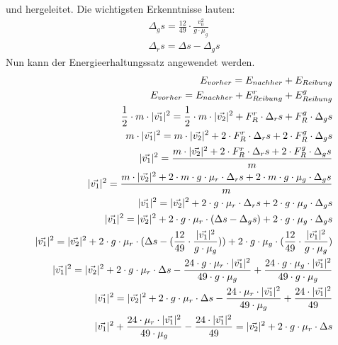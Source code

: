und hergeleitet. Die wichtigsten Erkenntnisse lauten:
\begin{align}
    \Delta_g s = \frac{12}{49} \cdot \frac{v_0^2}{g \cdot \mu_g}\\
    \Delta_r s = \Delta s - \Delta_g s
\end{align}
Nun kann der Energieerhaltungssatz angewendet werden.
\begin{align}
    E_{vorher} = E_{nachher} + E_{Reibung}\\
    E_{vorher} = E_{nachher} + E^r_{Reibung} + E^g_{Reibung}\\
    \frac{1}{2} \cdot m \cdot \norm{\vec{v_1}}^2 = \frac{1}{2} \cdot m \cdot \norm{\vec{v_2}}^2 + F^r_R \cdot \Delta_r s + F^g_R \cdot \Delta_g s\\
    m \cdot \norm{\vec{v_1}}^2 = m \cdot \norm{\vec{v_2}}^2 + 2 \cdot F^r_R \cdot \Delta_r s + 2 \cdot F^g_R \cdot \Delta_g s\\
    \norm{\vec{v_1}}^2 = \frac{m \cdot \norm{\vec{v_2}}^2 + 2 \cdot F^r_R \cdot \Delta_r s + 2 \cdot F^g_R \cdot \Delta_g s}{m}\\
    \norm{\vec{v_1}}^2 = \frac{m \cdot \norm{\vec{v_2}}^2 + 2 \cdot m \cdot g \cdot \mu_r \cdot \Delta_r s + 2 \cdot m \cdot g \cdot \mu_g \cdot \Delta_g s}{m}\\
    \norm{\vec{v_1}}^2 = \norm{\vec{v_2}}^2 + 2 \cdot g \cdot \mu_r \cdot \Delta_r s + 2 \cdot g \cdot \mu_g \cdot \Delta_g s\\
    \norm{\vec{v_1}}^2 = \norm{\vec{v_2}}^2 + 2 \cdot g \cdot \mu_r \cdot (\Delta s - \Delta_g s) + 2 \cdot g \cdot \mu_g \cdot \Delta_g s\\
    \norm{\vec{v_1}}^2 = \norm{\vec{v_2}}^2 + 2 \cdot g \cdot \mu_r \cdot (\Delta s - (\frac{12}{49} \cdot \frac{\norm{\vec{v_1}}^2}{g \cdot \mu_g})) + 2 \cdot g \cdot \mu_g \cdot (\frac{12}{49} \cdot \frac{\norm{\vec{v_1}}^2}{g \cdot \mu_g})\\
    \norm{\vec{v_1}}^2 = \norm{\vec{v_2}}^2 + 2 \cdot g \cdot \mu_r \cdot \Delta s - \frac{24 \cdot g \cdot \mu_r \cdot \norm{\vec{v_1}}^2}{49 \cdot g \cdot \mu_g} + \frac{24 \cdot g \cdot \mu_g \cdot \norm{\vec{v_1}}^2}{49 \cdot g \cdot \mu_g}\\
    \norm{\vec{v_1}}^2 = \norm{\vec{v_2}}^2 + 2 \cdot g \cdot \mu_r \cdot \Delta s - \frac{24 \cdot \mu_r \cdot \norm{\vec{v_1}}^2}{49 \cdot \mu_g} + \frac{24 \cdot \norm{\vec{v_1}}^2}{49}\\
    \norm{\vec{v_1}}^2 +  \frac{24 \cdot \mu_r \cdot \norm{\vec{v_1}}^2}{49 \cdot \mu_g} - \frac{24 \cdot \norm{\vec{v_1}}^2}{49}= \norm{\vec{v_2}}^2 + 2 \cdot g \cdot \mu_r \cdot \Delta s\\

\end{align}
